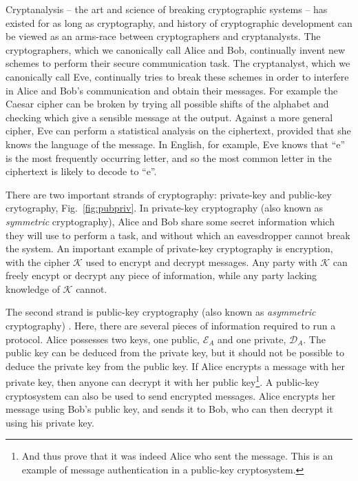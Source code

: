 Cryptanalysis -- the art and science of breaking cryptographic systems -- has existed for as long as cryptography, and history of cryptographic development can be viewed as an arms-race between cryptographers and cryptanalysts. The cryptographers, which we canonically call Alice and Bob, continually invent new schemes to perform their secure communication task. The cryptanalyst, which we canonically call Eve, continually tries to break these schemes in order to interfere in Alice and Bob's communication and obtain their messages. For example the Caesar cipher can be broken by trying all possible shifts of the alphabet and checking which give a sensible message at the output. Against a more general cipher, Eve can perform a statistical analysis on the ciphertext, provided that she knows the language of the message. In English, for example, Eve knows that ``e'' is the most frequently occurring letter, and so the most common letter in the ciphertext is likely to decode to ``e''.

There are two important strands of cryptography: private-key and public-key crytography, Fig.~\ref{fig:pubpriv}. In private-key cryptography (also known as \emph{symmetric} cryptography), Alice and Bob share some secret information which they will use to perform a task, and without which an eavesdropper cannot break the system. An important example of private-key cryptography is encryption, with the cipher $\mathcal{K}$ used to encrypt and decrypt messages. Any party with $\mathcal{K}$ can freely encypt or decrypt any piece of information, while any party lacking knowledge of $\mathcal{K}$ cannot. %



The second strand is public-key cryptography (also known as \emph{asymmetric} cryptography) \cite{Diffie1976}. Here, there are several pieces of information required to run a protocol. %
Alice possesses two keys, one public, $\mathcal{E}_A$ and one private, $\mathcal{D}_A$. The public key can be deduced from the private key, but it should not be possible to deduce the private key from the public key. If Alice encrypts a message with her private key, then anyone can decrypt it with her public key\footnote{And thus prove that it was indeed Alice who sent the message. This is an example of message authentication in a public-key cryptosystem.}. A public-key cryptosystem can also be used to send encrypted messages. Alice encrypts her message using Bob's public key, and sends it to Bob, who can then decrypt it using his private key.

